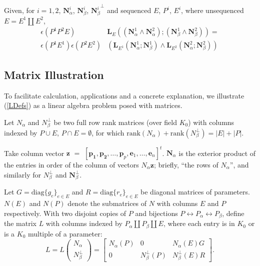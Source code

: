\documentclass[Unicode]{cedram-alco}
\newcommand{\ext}[1]{\ensuremath{\mathbf{#1}}}
\newcommand{\Nal}{\ensuremath{N_{\alpha}}}
\newcommand{\NbePe}{\ensuremath{N_{\beta}^{\perp}}}
\newcommand{\dunion}{\coprod}
\newcommand{\LHorSub}[3]{\ext{L}_{#1}\left(  {#2}; {#3}  \right)}
\begin{document}
\begin{theo*}
Given, for $i = 1, 2$,
  $\ext{N}_\alpha^{i}$,  $\ext{N}_\beta^{i}$, ${\ext{N}_\beta^{i}}^\perp$ 
  and
  sequenced $E$, $P^{i}$, $E^{i}$, where unsequenced $E=E^{1}\dunion E^{2}$,
  \begin{equation}\label{productequation-intro}
    \begin{split}
    \epsilon(P^1P^2E)
    &\LHorSub{E}
            {(\ext{N}_\alpha^{1}\wedge\ext{N}_\alpha^{2})}
            {(\ext{N}_\beta^{1}\wedge\ext{N}_\beta^{2})}
    = \\
    \epsilon(P^{1}E^{1})
    \epsilon(P^{2}E^{2}) 
        &\left(\LHorSub{E^{1}}{\ext{N}_\alpha^{1}}{\ext{N}_\beta^{1}}
        \wedge
        \LHorSub{E^{2}}{\ext{N}_\alpha^{2}}{\ext{N}_\beta^{2}}
          \right)
    \end{split}
  \end{equation}
\end{theo*}






\subsection{Matrix Illustration}
To facilitate calculation, applications and a concrete explanation,
we illustrate (\ref{LDefs}) as a linear algebra problem
posed with matrices.

Let $\Nal$ and $\NbePe$ be two full row rank matrices (over field $K_0$)
with columns indexed by $P\cup E$, $P\cap E=\emptyset$,
for which $\text{rank}(\Nal)+\text{rank}(\NbePe)=|E|+|P|$.

Take column vector $\ext{z}$
$=$ $[\ext{p_1},\ext{p_2},\ldots,\ext{p}_p,\ext{e}_1,\ldots,\ext{e}_n]^t$.
$\ext{N}_\alpha$ is the exterior product of the entries in order
of the column of vectors $\Nal \ext{z}$; briefly, ``the rows of $\Nal$'',
and similarly for $\NbePe$ and $\ext{N}_\beta^\perp$.


Let
$G=\text{diag}\{g_e\}_{e\in E} $ and $R=\text{diag}\{r_e\}_{e\in E}$
be diagonal matrices of parameters.
$N(E)$ and $N(P)$ denote the submatrices of $N$
with columns $E$ and $P$ respectively. With
two disjoint copies of $P$ and bijections
$P \leftrightarrow P_{\alpha}\leftrightarrow P_{\beta}$, define the matrix $L$
with columns indexed by $P_\alpha \dunion P_\beta \dunion E$, where each entry
is in $K_0$ or is a $K_0$ multiple of a parameter:
\begin{equation}\label{LmatrixDef}
    L = L\left(\begin{array}{cc} {\Nal} \\ {\NbePe}  \end{array}\right)
    = \left[\begin{array}{c|c|c} \Nal(P)  &  0  &  \Nal(E)G \\  \hline
        0  & \NbePe(P)  &  \NbePe(E)R \end{array}\right].
\end{equation}
\end{document}
